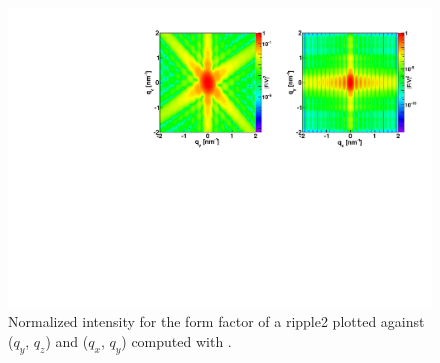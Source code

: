\begin{figure}[ht]
\begin{center}
\includegraphics[angle=-90,width=\textwidth]{Figures/ff/figffripple2.pdf}
\end{center}
\caption{Normalized intensity for the form factor of a ripple2 plotted against ($q_y$, $q_z$) and  ($q_x$, $q_y$)
  computed with .}
\label{fig:FFripple2Ex}
\end{figure}




